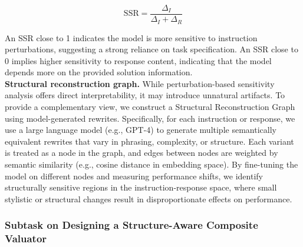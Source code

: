 \documentclass[12pt,a4paper]{article}
\begin{document}
\vspace{-1em}
\begin{equation}
\text{SSR} = \frac{\Delta_I}{\Delta_I + \Delta_R}
\end{equation}
\vspace{-1em}

An SSR close to 1 indicates the model is more sensitive to instruction perturbations, suggesting a strong reliance on task specification. An SSR close to 0 implies higher sensitivity to response content, indicating that the model depends more on the provided solution information.\\
\textbf{Structural reconstruction graph.} While perturbation-based sensitivity analysis offers direct interpretability, it may introduce unnatural artifacts. To provide a complementary view, we construct a Structural Reconstruction Graph using model-generated rewrites. Specifically, for each instruction or response, we use a large language model (e.g., GPT-4) to generate multiple semantically equivalent rewrites that vary in phrasing, complexity, or structure. Each variant is treated as a node in the graph, and edges between nodes are weighted by semantic similarity (e.g., cosine distance in embedding space). By fine-tuning the model on different nodes and measuring performance shifts, we identify structurally sensitive regions in the instruction-response space, where small stylistic or structural changes result in disproportionate effects on performance.



\vspace{-10pt}
\subsubsection{Subtask on Designing a Structure-Aware Composite Valuator}
\label{subsubsec:scv_design}
\vspace{-5pt}
\end{document}
